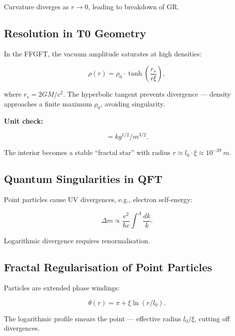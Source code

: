 	Curvature diverges as \(r \to 0\), leading to breakdown of GR.
	
	\subsection*{Resolution in T0 Geometry}
	
	In the FFGFT, the vacuum amplitude saturates at high densities:
	
	\begin{equation}
		\rho(r) = \rho_0 \cdot \tanh\left(\frac{r_s}{r \xi}\right),
	\end{equation}
	
	where \(r_s = 2GM/c^2\). The hyperbolic tangent prevents divergence — density approaches a finite maximum \(\rho_0\), avoiding singularity.
	
	\textbf{Unit check:}
	
	\begin{equation}
		[\rho(r)] = \si{kg^{1/2}/m^{3/2}}.
	\end{equation}
	
	The interior becomes a stable “fractal star” with radius \(r \approx l_0 \cdot \xi \approx 10^{-39} \ \si{m}\).
	
	\subsection*{Quantum Singularities in QFT}
	
	Point particles cause UV divergences, e.g., electron self-energy:
	
	\begin{equation}
		\Delta m \propto \frac{e^2}{\hbar c} \int^\Lambda \frac{dk}{k}.
	\end{equation}
	
	Logarithmic divergence requires renormalisation.
	
	\subsection*{Fractal Regularisation of Point Particles}
	
	Particles are extended phase windings:
	
	\begin{equation}
		\theta(r) = \pi + \xi \ln(r/l_0).
	\end{equation}
	
	The logarithmic profile smears the point — effective radius \(l_0 / \xi\), cutting off divergences.
	

